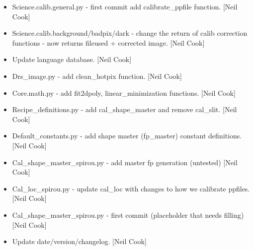 \documentclass[a4paper,10pt,english]{report}
\begin{document}
\begin{itemize}
\item {} 
Science.calib.general.py - first commit add calibrate\_ppfile function.
{[}Neil Cook{]}

\item {} 
Science.calib.background/badpix/dark - change the return of calib
correction functions - now returns fileused + corrected image. {[}Neil
Cook{]}

\item {} 
Update language database. {[}Neil Cook{]}

\item {} 
Drs\_image.py - add clean\_hotpix function. {[}Neil Cook{]}

\item {} 
Core.math.py - add fit2dpoly, linear\_minimization functions. {[}Neil
Cook{]}

\item {} 
Recipe\_definitions.py - add cal\_shape\_master and remove cal\_slit.
{[}Neil Cook{]}

\item {} 
Default\_constants.py - add shape master (fp\_master) constant
definitions. {[}Neil Cook{]}

\item {} 
Cal\_shape\_master\_spirou.py - add master fp generation (untested) {[}Neil
Cook{]}

\item {} 
Cal\_loc\_spirou.py - update cal\_loc with changes to how we calibrate
ppfiles. {[}Neil Cook{]}

\item {} 
Cal\_shape\_master\_spirou.py - first commit (placeholder that needs
filling) {[}Neil Cook{]}

\item {} 
Update date/version/changelog. {[}Neil Cook{]}

\end{itemize}
\end{document}
